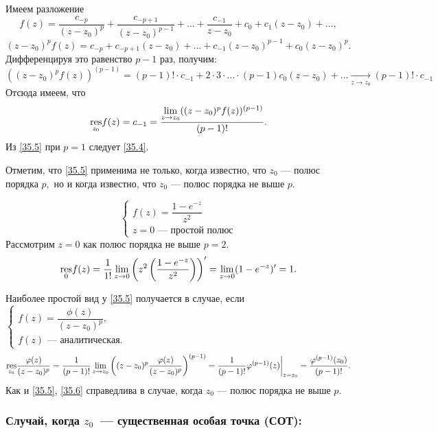 \documentclass[../../main.tex]{subfiles}
\begin{document}
	Имеем разложение 
	\[
		f(z) = \frac{c_{-p}}{(z-z_0)^{p}} + \frac{c_{-p+1}}{(z-z_0)^{p-1}} + \ldots 
		+ 
		\frac{c_{-1}}{z-z_0} + c_0 + c_1(z-z_0) + \ldots,
	\]
	\[
		(z-z_0)^pf(z) = c_{-p} + c_{-p+1}(z-z_0) + \ldots + c_{-1}(z-z_0)^{p-1} + 
		c_0(z-z_0)^p.
	\]
	Дифференцируя это равенство $p-1$ раз, получим:
	\[
		((z-z_0)^pf(z))^{(p-1)} = (p-1)!\cdot c_{-1} + 2 \cdot 3 \cdot \ldots \cdot 
		(p-1)c_0(z-z_0) + \ldots 
		\underset{z \to z_0}{\to} (p-1)!\cdot c_{-1}
	\]
	Отсюда имеем, что
	\begin{equation} \label{35.5}
		\underset{z_0}{\operatorname{res}} f(z) = c_{-1} = \frac{
		\lim\limits_{z\to z_0} ((z-z_0)^pf(z))^{(p-1)} }{(p-1)!}.
	\end{equation}
	Из \eqref{35.5} при $p=1$ следует \eqref{35.4}.
	
	Отметим, что \eqref{35.5} применима не только, когда известно, что $z_0$ --- 
	полюс порядка $p,$ но и когда известно, что $z_0$ --- полюс порядка не выше 
	$p.$
	
	\begin{example}
		\[
			\begin{cases}
				f(z) = \dfrac{1-e^{-z}}{z^2} \\
				z = 0 \text{ --- простой полюс}
			\end{cases}
		\]
		Рассмотрим $z = 0$ как полюс порядка не выше $p=2.$
		\[
			\underset{0}{\operatorname{res}}f(z) = \dfrac{1}{1!}\lim_{z\to 
			0}\left(z^2\left(\dfrac{1-e^{-z}}{z^2}\right)\right)' = 
			\lim_{z\to 0} (1 - e^{-z})' = 1.
		\]
	\end{example}
	
	\medskip
	
	Наиболее простой вид у \eqref{35.5} получается в случае, если $\begin{cases}
	f(z)  = \dfrac{\phi(z)}{(z-z_0)^p}, \\
	f(z) \text{ --- аналитическая.}
	\end{cases}$
	\begin{equation} \label{35.6}
		\underset{z_0}{\operatorname{res}}  \frac{\varphi(z)}{(z-z_0)^p} = \frac{1}{(p-1)!}
		 \lim\limits_{z\to z_0} \left((z-z_0)^p 
		 \frac{\varphi(z)}{(z-z_0)^p}\right)^{(p-1)} = 
		 \frac{1}{(p-1)!} \varphi^{(p-1)}(z)\bigg|_{z = z_0} = 
		 \frac{\varphi^{(p-1)}(z_0)}{(p-1)!}.
	\end{equation}
	Как и \eqref{35.5}, \eqref{35.6} справедлива в случае, когда $z_0$ --- полюс 
	порядка не выше $p$.
	
	\subsubsection*{Случай, когда $z_0$~--- существенная особая точка (СОТ):}
	
\end{document}
